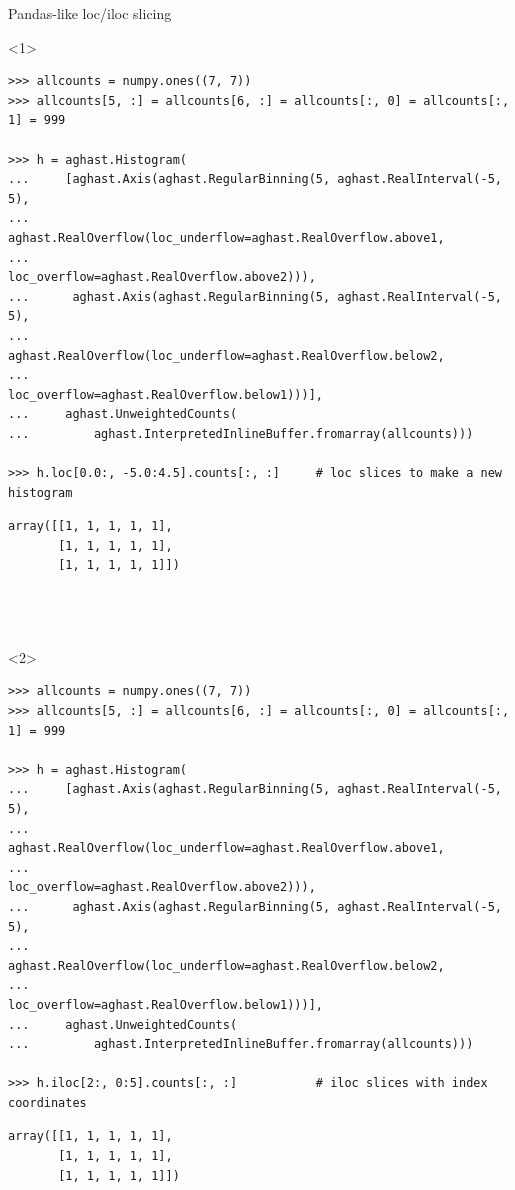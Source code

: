\documentclass[aspectratio=169]{beamer}
\begin{document}
\begin{frame}[fragile]{Pandas-like loc/iloc slicing}
\scriptsize
\vspace{0.4 cm}
\begin{onlyenv}<1>
\begin{verbatim}
>>> allcounts = numpy.ones((7, 7))
>>> allcounts[5, :] = allcounts[6, :] = allcounts[:, 0] = allcounts[:, 1] = 999

>>> h = aghast.Histogram(
...     [aghast.Axis(aghast.RegularBinning(5, aghast.RealInterval(-5, 5),
...                  aghast.RealOverflow(loc_underflow=aghast.RealOverflow.above1,
...                                      loc_overflow=aghast.RealOverflow.above2))),
...      aghast.Axis(aghast.RegularBinning(5, aghast.RealInterval(-5, 5),
...                  aghast.RealOverflow(loc_underflow=aghast.RealOverflow.below2,
...                                      loc_overflow=aghast.RealOverflow.below1)))],
...     aghast.UnweightedCounts(
...         aghast.InterpretedInlineBuffer.fromarray(allcounts)))

>>> h.loc[0.0:, -5.0:4.5].counts[:, :]     # loc slices to make a new histogram
\end{verbatim}
\begin{verbatim}
array([[1, 1, 1, 1, 1], 
       [1, 1, 1, 1, 1], 
       [1, 1, 1, 1, 1]])




\end{verbatim}
\end{onlyenv}
\begin{onlyenv}<2>
\begin{verbatim}
>>> allcounts = numpy.ones((7, 7))
>>> allcounts[5, :] = allcounts[6, :] = allcounts[:, 0] = allcounts[:, 1] = 999

>>> h = aghast.Histogram(
...     [aghast.Axis(aghast.RegularBinning(5, aghast.RealInterval(-5, 5),
...                  aghast.RealOverflow(loc_underflow=aghast.RealOverflow.above1,
...                                      loc_overflow=aghast.RealOverflow.above2))),
...      aghast.Axis(aghast.RegularBinning(5, aghast.RealInterval(-5, 5),
...                  aghast.RealOverflow(loc_underflow=aghast.RealOverflow.below2,
...                                      loc_overflow=aghast.RealOverflow.below1)))],
...     aghast.UnweightedCounts(
...         aghast.InterpretedInlineBuffer.fromarray(allcounts)))

>>> h.iloc[2:, 0:5].counts[:, :]           # iloc slices with index coordinates
\end{verbatim}
\begin{verbatim}
array([[1, 1, 1, 1, 1], 
       [1, 1, 1, 1, 1], 
       [1, 1, 1, 1, 1]])





\end{verbatim}
\end{onlyenv}
\end{frame}
\end{document}
